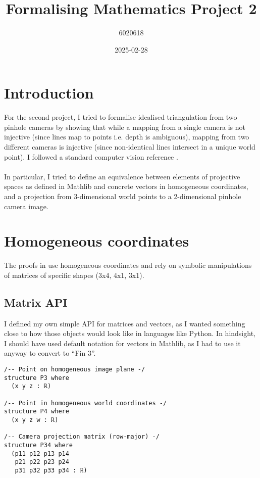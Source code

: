 \documentclass[a4paper, 12pt]{article}
\begin{document}
\title{Formalising Mathematics Project 2}
\author{6020618}
\date{2025-02-28}
\maketitle

\section*{Introduction}

For the second project,
I tried to formalise idealised triangulation from two pinhole cameras
by showing that while a mapping from a single camera is not injective
(since lines map to points i.e. depth is ambiguous),
mapping from two different cameras is injective
(since non-identical lines intersect in a unique world point).
I followed a standard computer vision reference \cite{hartley_multiple_2004}.
\\
\\
In particular, I tried to define an equivalence between
elements of projective spaces as defined in Mathlib
and concrete vectors in homogeneous coordinates,
and a projection from 3-dimensional world points
to a 2-dimensional pinhole camera image.

\section*{Homogeneous coordinates}

The proofs in \cite{hartley_multiple_2004} use homogeneous coordinates
and rely on symbolic manipulations of matrices of specific shapes (3x4, 4x1, 3x1).

\subsection*{Matrix API}

I defined my own simple API for matrices and vectors,
as I wanted something close to how those objects would look like in languages like Python.
In hindsight, I should have used default notation for vectors in Mathlib,
as I had to use it anyway to convert to ``Fin 3''.

\begin{lstlisting}
/-- Point on homogeneous image plane -/
structure P3 where
  (x y z : ℝ)

/-- Point in homogeneous world coordinates -/
structure P4 where
  (x y z w : ℝ)

/-- Camera projection matrix (row-major) -/
structure P34 where
  (p11 p12 p13 p14
   p21 p22 p23 p24
   p31 p32 p33 p34 : ℝ)
\end{lstlisting}
\end{document}
